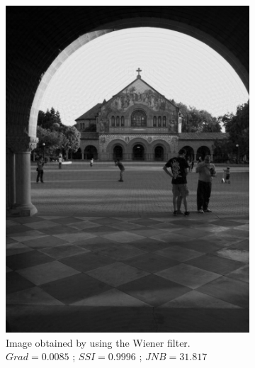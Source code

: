 \begin{figure}[H]
         \vspace{1.5cm}
        \begin{subfigure}[b]{0.35\textwidth}
                        \centering
                        \includegraphics[width=\textwidth]{memchu_wiener.jpg}
                        \caption{Image obtained by using the Wiener filter.\newline $Grad=0.0085$ ; $SSI=0.9996$ ; $JNB=31.817$}
        \end{subfigure}
        \hspace{1cm}
        \begin{subfigure}[b]{0.35\textwidth}
                        \centering

\end{subfigure}
\end{figure}
